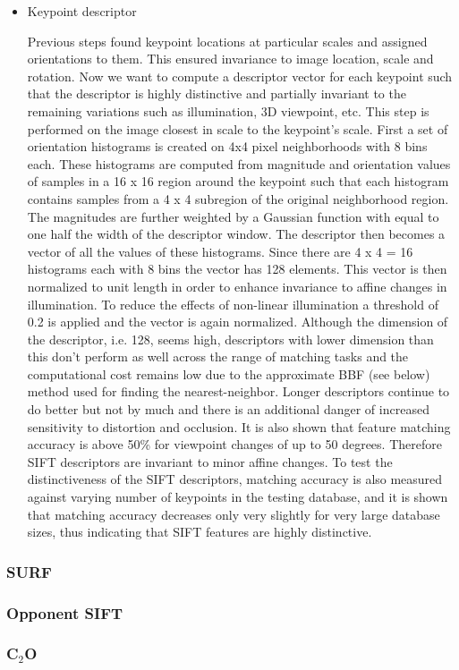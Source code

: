 \documentclass[12pt]{article}
\begin{document}
\begin{itemize}
	\item Keypoint descriptor

Previous steps found keypoint locations at particular scales and assigned orientations to them. This ensured invariance to image location, scale and rotation. Now we want to compute a descriptor vector for each keypoint such that the descriptor is highly distinctive and partially invariant to the remaining variations such as illumination, 3D viewpoint, etc. This step is performed on the image closest in scale to the keypoint's scale.
First a set of orientation histograms is created on 4x4 pixel neighborhoods with 8 bins each. These histograms are computed from magnitude and orientation values of samples in a 16 x 16 region around the keypoint such that each histogram contains samples from a 4 x 4 subregion of the original neighborhood region. The magnitudes are further weighted by a Gaussian function with   equal to one half the width of the descriptor window. The descriptor then becomes a vector of all the values of these histograms. Since there are 4 x 4 = 16 histograms each with 8 bins the vector has 128 elements. This vector is then normalized to unit length in order to enhance invariance to affine changes in illumination. To reduce the effects of non-linear illumination a threshold of 0.2 is applied and the vector is again normalized.
Although the dimension of the descriptor, i.e. 128, seems high, descriptors with lower dimension than this don't perform as well across the range of matching tasks and the computational cost remains low due to the approximate BBF (see below) method used for finding the nearest-neighbor. Longer descriptors continue to do better but not by much and there is an additional danger of increased sensitivity to distortion and occlusion. It is also shown that feature matching accuracy is above 50\% for viewpoint changes of up to 50 degrees. Therefore SIFT descriptors are invariant to minor affine changes. To test the distinctiveness of the SIFT descriptors, matching accuracy is also measured against varying number of keypoints in the testing database, and it is shown that matching accuracy decreases only very slightly for very large database sizes, thus indicating that SIFT features are highly distinctive.
	
	
	
	
\end{itemize}
\subsubsection{SURF}

\subsubsection{Opponent SIFT}

\subsubsection{C$_2$O}

\end{document}
